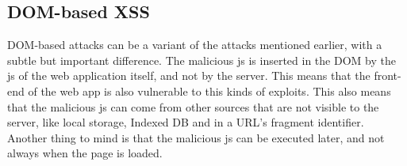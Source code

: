 \subsection{DOM-based XSS}
DOM-based attacks can be a variant of the attacks mentioned earlier, with a subtle but important difference. The malicious js is inserted in the DOM by the js of the web application itself, and not by the server. This means that the front-end of the web app is also vulnerable to this kinds of exploits. This also means that the malicious js can come from other sources that are not visible to the server, like local storage, Indexed DB and in a URL's fragment identifier. Another thing to mind is that the malicious js can be executed later, and not always when the page is loaded.




